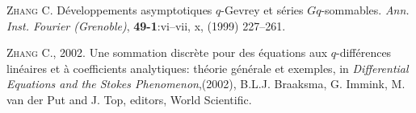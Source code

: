 \documentclass[english]{smfart}
\numberwithin{equation}{thm}
\begin{document}
\begin{thebibliography}{}
 \textsc{Zhang C.}
D\'eveloppements asymptotiques {$q$}-{G}evrey et s\'eries
{$Gq$}-sommables.
\emph{Ann. Inst. Fourier (Grenoble)}, {\bf 49-1}:vi--vii, x,
(1999) 227--261.

 \textsc{Zhang C., 2002.}
Une sommation discr\`ete pour des \'equations
aux $q$-diff\'erences lin\'eaires et \`a coefficients
analytiques: th\'eorie g\'en\'erale et exemples,
in \emph{Differential Equations and the Stokes Phenomenon},(2002),
  B.L.J. Braaksma, G. Immink, M. van der Put and J. Top, editors,
World Scientific.

\end{thebibliography}
\end{document}
